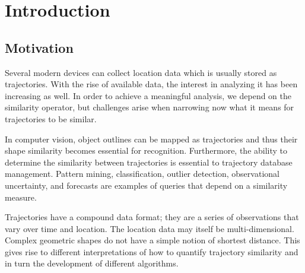 \chapter{Introduction}
\label{ch:1}

\section{Motivation}



Several modern devices can collect location data which is usually stored as trajectories.
With the rise of available data, the interest in analyzing it has been increasing as well. 
In order to achieve a meaningful analysis, we depend on the similarity operator, but challenges arise when narrowing now what it means for trajectories to be similar. 

In computer vision, object outlines can be mapped as trajectories and thus their shape similarity becomes essential for recognition. 
Furthermore, the ability to determine the similarity between trajectories is essential to trajectory database management. Pattern mining, classification, outlier detection, observational uncertainty, and forecasts are examples of queries that depend on a similarity measure\cite{31-ShapebasedSimilarity,80-TrajectoryData,92-TrajectoryIndexing,51-HausdorffDistance}.

Trajectories have a compound data format; they are a series of observations that vary over time and location. The location data may itself be multi-dimensional. Complex geometric shapes do not have a simple notion of shortest distance. This gives rise to different interpretations of how to quantify trajectory similarity and in turn the development of different algorithms. 

